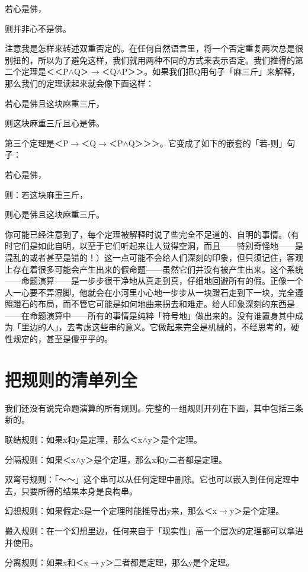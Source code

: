 \documentclass[
  12pt,
  twoside,
  openright,
  oldfontcommands,
]{memoir}
\begin{document}
若心是佛，

则并非心不是佛。

注意我是怎样来转述双重否定的。在任何自然语言里，将一个否定重复两次总是很别扭的，所以为了避免这样，我们就用两种不同的方式来表示否定。我们推得的第二个定理是＜＜P$\wedge$Q＞$\rightarrow$＜Q$\wedge$P＞＞。如果我们把Q用句子「麻三斤」来解释，那么我们的定理读起来就会像下面这样：

若心是佛且这块麻重三斤，

则这块麻重三斤且心是佛。

第三个定理是＜P$\rightarrow$＜Q$\rightarrow$＜P$\wedge$Q＞＞＞。它变成了如下的嵌套的「若-则」句子：

若心是佛，

则：若这块麻重三斤，

则心是佛且这块麻重三斤。

你可能已经注意到了，每个定理被解释时说了些完全不足道的、自明的事情。（有时它们是如此自明，以至于它们听起来让人觉得空洞，而且------特别奇怪地------是混乱的或者甚至是错的！）这一点可能不会给人们深刻的印象，但只须记住，客观上存在着很多可能会产生出来的假命题------虽然它们并没有被产生出来。这个系统------命题演算------是一步步很干净地从真走到真，仔细地回避所有的假。正像一个人一心要不弄湿脚，他就会在小河里小心地一步步从一块蹬石走到下一块，完全遵照蹬石的布局，而不管它可能是如何地曲来拐去和难走。给人印象深刻的东西是------在命题演算中------所有的事情是纯粹「符号地」做出来的。没有谁置身其中成为「里边的人」，去考虑这些串的意义。它做起来完全是机械的，不经思考的，硬性规定的，甚至是傻乎乎的。

\section{把规则的清单列全}

我们还没有说完命题演算的所有规则。完整的一组规则开列在下面，其中包括三条新的。

联结规则：如果x和y是定理，那么＜x$\wedge$y＞是个定理。

分隔规则：如果＜x$\wedge$y＞是个定理，那么x和y二者都是定理。

双弯号规则：「～～」这个串可以从任何定理中删除。它也可以嵌入到任何定理中去，只要所得的结果本身是良构串。

幻想规则：如果假定x是一个定理时能推导出y来，那么＜x$\rightarrow$y＞是个定理。

搬入规则：在一个幻想里边，任何来自于「现实性」高一个层次的定理都可以拿进并使用。

分离规则：如果x和＜x$\rightarrow$y＞二者都是定理，那么y是个定理。
\end{document}

